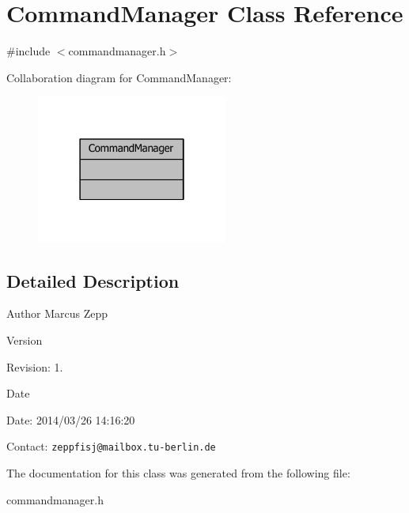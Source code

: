 \section{Command\-Manager Class Reference}
\label{classCommandManager}


{\ttfamily \#include $<$commandmanager.\-h$>$}



Collaboration diagram for Command\-Manager\-:
\nopagebreak
\begin{figure}[H]
\begin{center}
\leavevmode
\includegraphics[width=178pt]{d3/d21/classCommandManager__coll__graph}
\end{center}
\end{figure}


\subsection{Detailed Description}
\begin{DoxyAuthor}{Author}
Marcus Zepp
\end{DoxyAuthor}
\begin{DoxyVersion}{Version}

\end{DoxyVersion}
\begin{DoxyParagraph}{Revision\-:}
1. 
\end{DoxyParagraph}


\begin{DoxyDate}{Date}

\end{DoxyDate}
\begin{DoxyParagraph}{Date\-:}
2014/03/26 14\-:16\-:20 
\end{DoxyParagraph}


Contact\-: {\tt zeppfisj@mailbox.\-tu-\/berlin.\-de} 

The documentation for this class was generated from the following file\-:\begin{DoxyCompactItemize}
\item 
commandmanager.\-h\end{DoxyCompactItemize}
